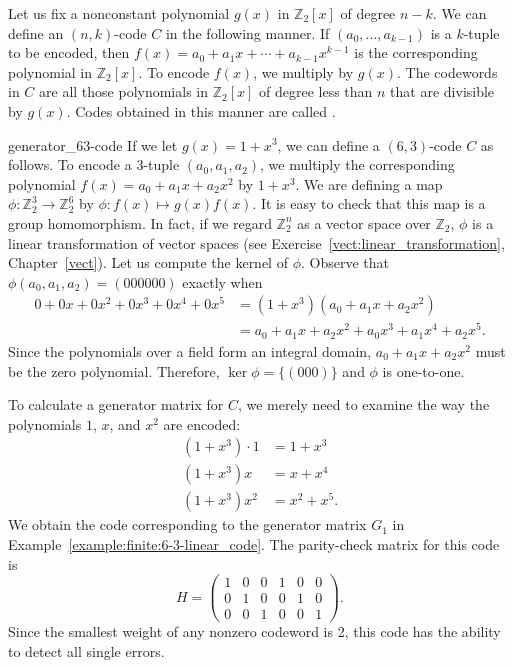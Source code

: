Let us fix a nonconstant polynomial $g(x)$ in ${\mathbb Z}_2[x]$ of degree \mbox{$n - k$}.  We can define an $(n,k)$-code $C$ in the following manner.  If $(a_0, \ldots, a_{k-1})$ is a $k$-tuple to be encoded, then $f(x) = a_0 + a_1 x +  \cdots + a_{k-1} x^{k-1}$ is the corresponding polynomial
in ${\mathbb Z}_2[x]$.  To encode $f(x)$, we multiply by $g(x)$.  The codewords in $C$ are all those polynomials in ${\mathbb Z}_2[x]$ of degree less than  $n$ that are divisible by $g(x)$.  Codes obtained in this manner are called .  


\begin{example}{generator_63-code}
If we let $g(x)= 1 + x^3$, we can define a $(6,3)$-code $C$ as follows.  To encode a 3-tuple $( a_0, a_1, a_2 )$, we multiply the corresponding polynomial $f(x) = a_0 + a_1 x + a_2 x^2$ by $1 + x^3$.  We are defining a map $\phi : {\mathbb Z}_2^3 \rightarrow {\mathbb Z}_2^6$ by $\phi  : f(x) \mapsto g(x) f(x)$.  It is easy to check that this map is a group homomorphism.  In fact, if we regard ${\mathbb Z}_2^n$ as a vector space over ${\mathbb Z}_2$, $\phi$ is a linear transformation of vector spaces (see Exercise~\ref{vect:linear_transformation}, Chapter~\ref{vect}).  Let us compute the kernel of $\phi$.  Observe that $\phi ( a_0, a_1, a_2 ) = (000000)$ exactly when 
\begin{align*}
0 + 0x + 0x^2 + 0x^3 + 0x^4 + 0 x^5 
& = (1 + x^3) ( a_0 + a_1 x + a_2 x^2 ) \\ 
& = a_0 + a_1 x + a_2 x^2 + a_0 x^3 + a_1 x^4 + a_2 x^5.
\end{align*}
Since the polynomials over a field form an integral domain, $a_0 + a_1 x + a_2 x^2$ must be the zero polynomial. Therefore, $\ker \phi = \{ (000) \}$ and $\phi$ is one-to-one. 
 

To calculate a generator matrix for $C$, we merely need to examine the way the polynomials $1$, $x$, and $x^2$ are encoded:
\begin{align*}
(1 + x^3) \cdot 1 & = 1 + x^3 \\
(1 + x^3)x & = x + x^4 \\
(1 + x^3)x^2 & = x^2 + x^5. 
\end{align*}  %
We obtain the code corresponding to the generator matrix $G_1$ in Example~\ref{example:finite:6-3-linear_code}.  The parity-check matrix for this code is
\[
H
= 
\begin{pmatrix}
1 & 0 & 0 & 1 & 0 & 0 \\
0 & 1 & 0 & 0 & 1 & 0 \\
0 & 0 & 1 & 0 & 0 & 1 
\end{pmatrix}.
\]
Since the smallest weight of any nonzero codeword is 2, this code has the ability to detect all single errors.  
\end{example}


